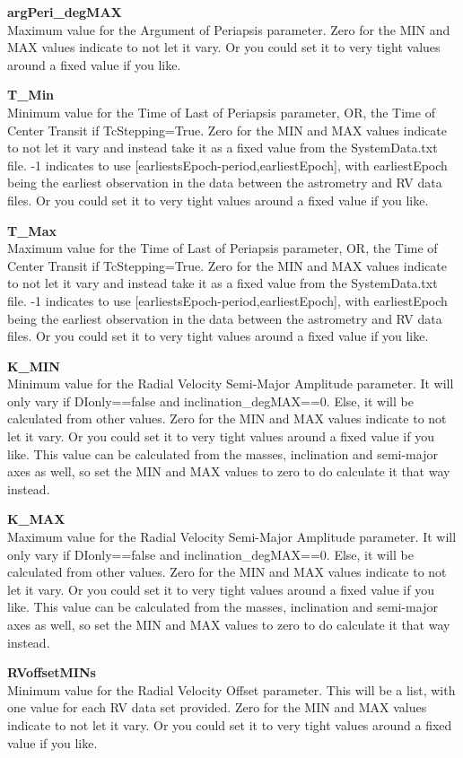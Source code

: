 \documentclass[12pt,preprint]{aastex}
\begin{document}
{\bf argPeri\_degMAX}\\
Maximum value for the Argument of Periapsis parameter.
Zero for the MIN and MAX values indicate to not let it vary.  Or you could set it to very tight values around a fixed value if you like.

{\bf T\_Min}\\
Minimum value for the Time of Last of Periapsis parameter, OR, the Time of Center Transit if TcStepping=True.
Zero for the MIN and MAX values indicate to not let it vary and instead take it as a fixed value from the SystemData.txt file.  -1 indicates to use [earliestsEpoch-period,earliestEpoch], with earliestEpoch being the earliest observation in the data between the astrometry and RV data files.  Or you could set it to very tight values around a fixed value if you like.

{\bf T\_Max}\\
Maximum value for the Time of Last of Periapsis parameter, OR, the Time of Center Transit if TcStepping=True.
Zero for the MIN and MAX values indicate to not let it vary and instead take it as a fixed value from the SystemData.txt file.  -1 indicates to use [earliestsEpoch-period,earliestEpoch], with earliestEpoch being the earliest observation in the data between the astrometry and RV data files.  Or you could set it to very tight values around a fixed value if you like.

{\bf K\_MIN}\\
Minimum value for the Radial Velocity Semi-Major Amplitude parameter.  It will only vary if DIonly==false and inclination\_degMAX==0.  Else, it will be calculated from other values.
Zero for the MIN and MAX values indicate to not let it vary.  Or you could set it to very tight values around a fixed value if you like.  This value can be calculated from the masses, inclination and semi-major axes as well, so set the MIN and MAX values to zero to do calculate it that way instead.

{\bf K\_MAX}\\
Maximum value for the Radial Velocity Semi-Major Amplitude parameter.  It will only vary if DIonly==false and inclination\_degMAX==0.  Else, it will be calculated from other values.
Zero for the MIN and MAX values indicate to not let it vary.  Or you could set it to very tight values around a fixed value if you like.  This value can be calculated from the masses, inclination and semi-major axes as well, so set the MIN and MAX values to zero to do calculate it that way instead.

{\bf RVoffsetMINs}\\
Minimum value for the Radial Velocity Offset parameter.  This will be a list, with one value for each RV data set provided.
Zero for the MIN and MAX values indicate to not let it vary.  Or you could set it to very tight values around a fixed value if you like.
\end{document}
